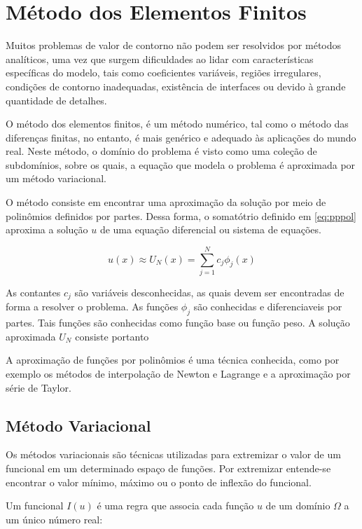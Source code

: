\section{Método dos Elementos Finitos}

Muitos problemas de valor de contorno não podem ser resolvidos por métodos analíticos, uma vez que surgem dificuldades ao lidar com características específicas do modelo, tais como coeficientes variáveis, regiões irregulares, condições de contorno inadequadas, existência de interfaces ou devido à grande quantidade de detalhes.
\citep[p. 410]{powers}

O método dos elementos finitos, é um método numérico, tal como o método das diferenças finitas, no entanto, é mais genérico e adequado às aplicações do mundo real. Neste método, o domínio do problema é visto como uma coleção de subdomínios, sobre os quais, a equação que modela o problema é aproximada por um método variacional.
\citep[p. 13]{reddy}


O método consiste em encontrar uma aproximação da solução por meio de polinômios definidos por partes. Dessa forma, o somatótrio definido em \ref{eq:pppol} aproxima a solução $ u $ de uma equação diferencial ou sistema de equações.
\citep[p. 97]{davis}

\begin{equation}
	\label{eq:pppol}
	u(x) \approx U_N (x) = \sum_{j = 1}^{N} c_j \phi_j (x)
\end{equation}

As contantes $ c_j $ são variáveis desconhecidas, as quais devem ser encontradas de forma a resolver o problema. As funções $ \phi_j $ são conhecidas e diferenciaveis por partes. Tais funções são conhecidas como função base ou função peso. A solução aproximada $ U_N $ consiste portanto

A aproximação de funções por polinômios é uma técnica conhecida, como por exemplo os métodos de interpolação de Newton e Lagrange e a aproximação por série de Taylor. 

\subsection{Método Variacional}
Os métodos variacionais são técnicas utilizadas para extremizar o valor de um funcional em um determinado espaço de funções. Por extremizar entende-se encontrar o valor mínimo, máximo ou o ponto de inflexão do funcional.

Um funcional $ I(u) $ é uma regra que associa cada função $ u $ de um domínio $ \Omega $ a um único número real:

